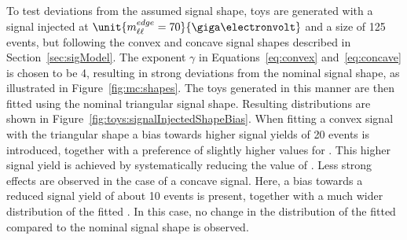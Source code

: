 To test deviations from the assumed signal shape, toys are generated with a signal injected at $\unit{\mlledge = 70}{\giga\electronvolt}$ and a size of 125 events, but following the convex and concave signal shapes described in Section~\ref{sec:sigModel}. The exponent $\gamma$ in Equations~\ref{eq:convex} and~\ref{eq:concave} is chosen to be 4, resulting in strong deviations from the nominal signal shape, as illustrated in Figure~\ref{fig:mc:shapes}. The toys generated in this manner are then fitted using the nominal triangular signal shape. Resulting distributions are shown in Figure~\ref{fig:toys:signalInjectedShapeBias}. When fitting a convex signal with the triangular shape a bias towards higher signal yields of 20 events is introduced, together with a preference of slightly higher values for \mlledge. This higher signal yield is achieved by systematically reducing the value of \Rsfof. Less strong effects are observed in the case of a concave signal. Here, a bias towards a reduced signal yield of about 10 events is present, together with a much wider distribution of the fitted \mlledge. In this case, no change in the distribution of the fitted \Rsfof compared to the nominal signal shape is observed. 

